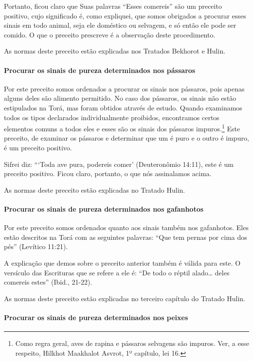 Portanto, ficou claro que Suas palavras ``Esses comereis'' são um preceito positivo, cujo significado é, como expliquei, que somos obrigados
a procurar esses sinais em todo animal, seja ele doméstico ou selvagem,
e só então ele pode ser comido. O que o preceito prescreve é a
observação deste procedimento.

As normas deste preceito estão explicadas nos Tratados Bekhorot e Hulin.

\paragraph{Procurar os sinais de pureza determinados nos pássaros}

Por este preceito somos ordenados a procurar os sinais nos pássaros,
pois apenas alguns deles são alimento permitido. No caso dos pássaros,
os sinais não estão estipulados na Torá, mas foram obtidos através de
estudo. Quando examinamos todos os tipos declarados individualmente
proibidos, encontramos certos elementos comuns a todos eles e esses são
os sinais dos pássaros impuros.\footnote{Como regra geral, aves de rapina e pássaros selvagens são impuros.
Ver, a esse respeito, Hilkhot Maakhalot Asvrot, 1º capítulo, lei 16.} Este preceito, de examinar os pássaros e
determinar que um é puro e o outro é impuro, é um preceito positivo.

Sifrei diz: ```Toda ave pura, podereis comer' (Deuteronômio 14:11), este
é um preceito positivo. Ficou claro, portanto, o que nós assinalamos
acima.

As normas deste preceito estão explicadas no Tratado Hulin.

\paragraph{Procurar os sinais de pureza determinados nos gafanhotos}

Por este preceito somos ordenados quanto aos sinais também nos
gafanhotos. Eles estão descritos na Torá com as seguintes palavras:
``Que tem pernas por cima dos pés'' (Levítico 11:21).

A explicação que demos sobre o preceito anterior também é válida para
este. O versículo das Escrituras que se refere a ele é: ``De todo o
réptil alado\ldots{} deles comereis estes'' (Ibid., 21-22).

As normas deste preceito estão explicadas no terceiro capítulo do
Tratado Hulin.

\paragraph{Procurar os sinais de pureza determinados nos peixes}

